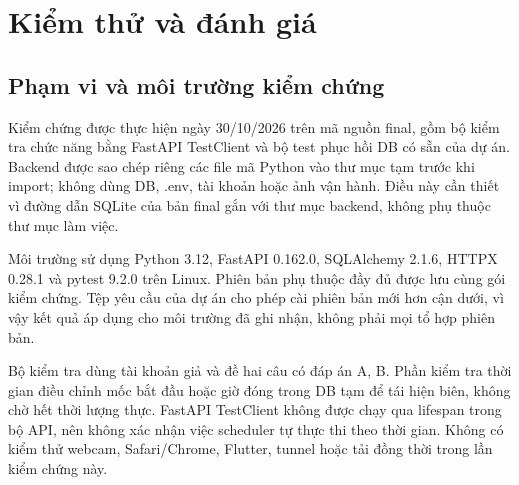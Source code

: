 
\chapter{Kiểm thử và đánh giá}
\section{Phạm vi và môi trường kiểm chứng}
Kiểm chứng được thực hiện ngày 30/10/2026 trên mã nguồn final, gồm bộ kiểm tra chức năng bằng FastAPI TestClient và bộ test phục hồi DB có sẵn của dự án. Backend được sao chép riêng các file mã Python vào thư mục tạm trước khi import; không dùng DB, .env, tài khoản hoặc ảnh vận hành. Điều này cần thiết vì đường dẫn SQLite của bản final gắn với thư mục backend, không phụ thuộc thư mục làm việc.

Môi trường sử dụng Python 3.12, FastAPI 0.162.0, SQLAlchemy 2.1.6, HTTPX 0.28.1 và pytest 9.2.0 trên Linux. Phiên bản phụ thuộc đầy đủ được lưu cùng gói kiểm chứng. Tệp yêu cầu của dự án cho phép cài phiên bản mới hơn cận dưới, vì vậy kết quả áp dụng cho môi trường đã ghi nhận, không phải mọi tổ hợp phiên bản.

Bộ kiểm tra dùng tài khoản giả và đề hai câu có đáp án A, B. Phần kiểm tra thời gian điều chỉnh mốc bắt đầu hoặc giờ đóng trong DB tạm để tái hiện biên, không chờ hết thời lượng thực. FastAPI TestClient không được chạy qua lifespan trong bộ API, nên không xác nhận việc scheduler tự thực thi theo thời gian. Không có kiểm thử webcam, Safari/Chrome, Flutter, tunnel hoặc tải đồng thời trong lần kiểm chứng này.

